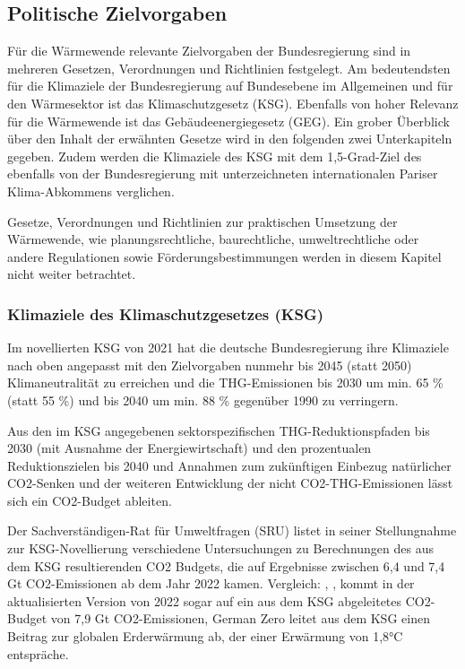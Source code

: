 				
		\subsection{Politische Zielvorgaben}
		\label{sec:Grundlagen:Wärmewende_in_D:Politische_Zielvorhaben}
			Für die Wärmewende relevante Zielvorgaben der Bundesregierung sind in mehreren Gesetzen, Verordnungen und Richtlinien festgelegt. Am bedeutendsten für die Klimaziele der Bundesregierung auf Bundesebene im Allgemeinen und für den Wärmesektor ist das Klimaschutzgesetz (KSG). Ebenfalls von hoher Relevanz für die Wärmewende ist das Gebäudeenergiegesetz (GEG). Ein grober Überblick über den Inhalt der erwähnten Gesetze wird in den folgenden zwei Unterkapiteln gegeben. Zudem werden die Klimaziele des KSG mit dem 1,5-Grad-Ziel des ebenfalls von der Bundesregierung mit unterzeichneten internationalen Pariser Klima-Abkommens verglichen. 
			
			Gesetze, Verordnungen und Richtlinien zur praktischen Umsetzung der Wärmewende, wie planungsrechtliche, baurechtliche, umweltrechtliche oder andere Regulationen sowie Förderungsbestimmungen werden in diesem Kapitel nicht weiter betrachtet.
			
			\subsubsection{Klimaziele des Klimaschutzgesetzes (KSG)}
			
				Im novellierten KSG von 2021 hat die deutsche Bundesregierung ihre Klimaziele nach oben angepasst mit den Zielvorgaben nunmehr bis 2045 (statt 2050) Klimaneutralität zu erreichen und die THG-Emissionen bis 2030 um min. 65 \% (statt 55 \%) und bis 2040 um min. 88 \% gegenüber 1990 zu verringern.\cite{web_gesetze_ksg_info}\cite{web_gesetze_ksg}
				
				Aus den im KSG angegebenen sektorspezifischen THG-Reduktionspfaden bis 2030 (mit Ausnahme der Energiewirtschaft) und den prozentualen Reduktionszielen bis 2040 und Annahmen zum zukünftigen Einbezug natürlicher CO2-Senken und der weiteren Entwicklung der nicht CO2-THG-Emissionen lässt sich ein CO2-Budget ableiten. 
				
				Der Sachverständigen-Rat für Umweltfragen (SRU) listet in seiner Stellungnahme zur KSG-Novellierung verschiedene Untersuchungen zu Berechnungen des aus dem KSG resultierenden CO2 Budgets, die auf Ergebnisse zwischen 6,4 und 7,4 Gt CO2-Emissionen ab dem Jahr 2022 kamen.\cite[S.~14]{SRU_Stellungnahme_CO2_Budget_2022} Vergleich: \cite[S.~12]{mcc_2022_ist_deutschland_auf_1_5_grad_pfad}, \cite[S.~11]{zbw_2022_pariskompatible_emissionspfade_bsp_eu}, kommt in der aktualisierten Version von 2022 sogar auf ein aus dem KSG abgeleitetes CO2-Budget von 7,9 Gt CO2-Emissionen, \cite{knoe_2022_mit_grüner_marktwirtschaft_klima_retten} German Zero leitet aus dem KSG einen Beitrag zur globalen Erderwärmung ab, der einer Erwärmung von 1,8°C entspräche. \cite[S.~37]{germanzero_2022_gesetztespaket_1_5_grad}

